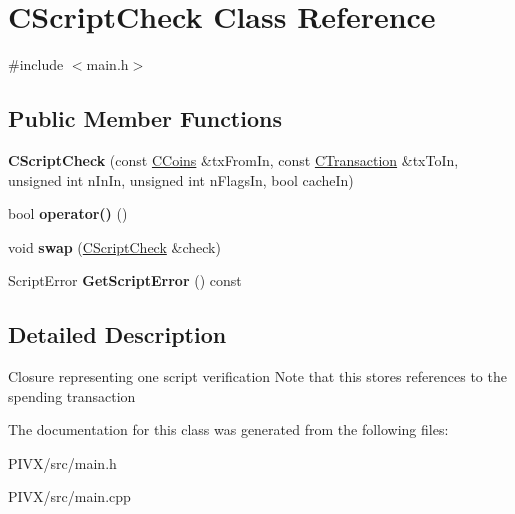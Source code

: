\hypertarget{class_c_script_check}{}\section{C\+Script\+Check Class Reference}
\label{class_c_script_check}


{\ttfamily \#include $<$main.\+h$>$}

\subsection*{Public Member Functions}
\begin{DoxyCompactItemize}
\item 
\mbox{\label{class_c_script_check_a2617b99b66cd1de327478b74d8441c76}} 
{\bfseries C\+Script\+Check} (const \mbox{\hyperlink{class_c_coins}{C\+Coins}} \&tx\+From\+In, const \mbox{\hyperlink{class_c_transaction}{C\+Transaction}} \&tx\+To\+In, unsigned int n\+In\+In, unsigned int n\+Flags\+In, bool cache\+In)
\item 
\mbox{\label{class_c_script_check_a108d4c713338308be3867ed4e65b80c5}} 
bool {\bfseries operator()} ()
\item 
\mbox{\label{class_c_script_check_a69fbde608ff29c1885b8b9caf0fd40a0}} 
void {\bfseries swap} (\mbox{\hyperlink{class_c_script_check}{C\+Script\+Check}} \&check)
\item 
\mbox{\label{class_c_script_check_a1340496c37e521c253606b5957173afd}} 
Script\+Error {\bfseries Get\+Script\+Error} () const
\end{DoxyCompactItemize}


\subsection{Detailed Description}
Closure representing one script verification Note that this stores references to the spending transaction 

The documentation for this class was generated from the following files\+:\begin{DoxyCompactItemize}
\item 
P\+I\+V\+X/src/main.\+h\item 
P\+I\+V\+X/src/main.\+cpp\end{DoxyCompactItemize}
